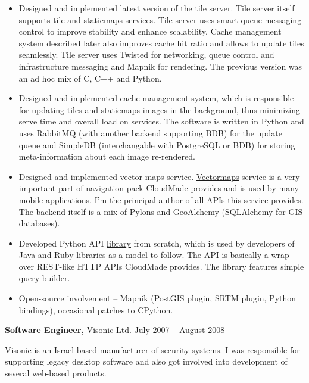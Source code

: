 \documentclass[margin]{res}
\begin{document}
\begin{resume}
\begin{itemize} \itemsep -1pt
\item Designed and implemented latest version of the tile
  server. Tile server itself supports
  \href{http://developers.cloudmade.com/projects/show/tiles}{tile} and
  \href{http://developers.cloudmade.com/projects/show/static-maps}{staticmaps}
  services.
  Tile server uses smart queue messaging control
  to improve stability and enhance scalability. Cache management system
  described later also improves cache hit ratio and
  allows to update tiles seamlessly. Tile server uses
  Twisted for networking, queue control and infrastructure messaging
  and Mapnik for rendering.
  The previous version was an ad hoc mix of C, C++ and Python.
\item Designed and implemented cache management system, which is
  responsible for updating tiles and staticmaps images in the
  background, thus minimizing serve time and overall load on
  services. The software is written in Python and uses RabbitMQ
  (with another backend supporting BDB) for the update queue and
  SimpleDB (interchangable with PostgreSQL or BDB) for storing
  meta-information about each image re-rendered.
\item Designed and implemented vector maps service.
  \href{http://developers.cloudmade.com/projects/show/vector-stream-server}{Vectormaps}
  service is a very important part of
  navigation pack CloudMade provides and is used by many
  mobile applications.
  I'm the principal author of all APIs this service
  provides. The backend itself is a mix of Pylons
  and GeoAlchemy (SQLAlchemy for GIS databases).
\item Developed Python API
  \href{http://developers.cloudmade.com/projects/show/python-lib}{library}
  from scratch,
  which is  used by developers of Java and Ruby
  libraries as a model to follow. The API is basically a wrap over
  REST-like HTTP APIs CloudMade provides. The library features simple
  query builder.
\item Open-source involvement -- Mapnik
  (PostGIS plugin, SRTM plugin,
  Python bindings), occasional patches to CPython.
\end{itemize}

{\bf Software Engineer,} Visonic Ltd. \hfill July 2007 -- August 2008

Visonic is an Israel-based manufacturer of security systems.
I was responsible for supporting legacy desktop software and
also got involved into development of several web-based
products.\\


\end{resume}
\end{document}

